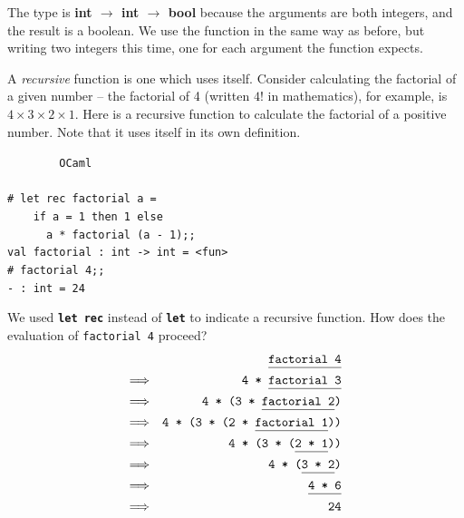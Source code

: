\documentclass[]{book}
\newcommand{\smspace}{\vspace{4mm}}
\begin{document}
\noindent The type is \textrm{\textbf{int $\rightarrow$ int $\rightarrow$ bool}} because the arguments are both integers, and the result is a boolean. We use the function in the same way as before, but writing two integers this time, one for each argument the function expects.

A \textit{recursive} function is one which uses itself. Consider calculating the factorial of a given number -- the factorial of 4 (written $4!$ in mathematics), for example, is $4\times3\times2\times1$. Here is a recursive function to calculate the factorial of a positive number. Note that it uses itself in its own definition.

\smspace
\noindent\verb!        OCaml!\\
\noindent\\
\noindent\verb!# let rec factorial a =!\\
\noindent\verb!    if a = 1 then 1 else!\\
\noindent\verb!      a * factorial (a - 1);;!\\
\noindent\verb!val factorial : int -> int = <fun>!\\
\noindent\texttt{\# factorial 4;;}\\
\noindent\verb!- : int = 24!
\smspace

\noindent We used \textbf{\texttt{let rec}} instead of \textbf{\texttt{let}} to indicate a recursive function.  How does the evaluation of \texttt{factorial 4} proceed?
\begin{eqnarray*}
 & & \texttt{\underline{\vphantom{g}factorial 4}} \\
 \Longrightarrow & & \texttt{4 * \underline{\vphantom{g}factorial 3}} \\
 \Longrightarrow & & \texttt{4 * (3 * \underline{\vphantom{g}factorial 2})} \\
 \Longrightarrow & & \texttt{4 * (3 * (2 * \underline{\vphantom{g}factorial 1}))}\\
 \Longrightarrow & & \texttt{4 * (3 * (\underline{\vphantom{g}2 * 1}))}\\
 \Longrightarrow & & \texttt{4 * (\underline{\vphantom{g}3 * 2})}\\
 \Longrightarrow & & \texttt{\underline{\vphantom{g}4 * 6}} \\
 \Longrightarrow & & \verb!24!
\end{eqnarray*}
\end{document}
